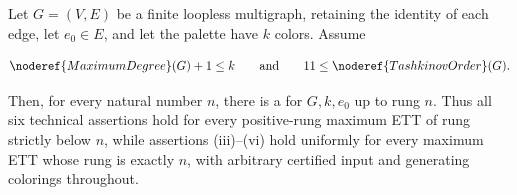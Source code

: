 \begin{theorem}
Let \(G=(V,E)\) be a finite loopless multigraph, retaining the identity of
each edge, let \(e_0\in E\), and let the palette have \(k\) colors.  Assume

\[
  \noderef{MaximumDegree}(G)+1\leq k
  \qquad\hbox{and}\qquad
  11\leq\noderef{TashkinovOrder}(G).
\]

Then, for every natural number \(n\), there is a
 for \(G,k,e_0\) up to rung \(n\).
Thus all six technical assertions hold for every positive-rung maximum ETT
of rung strictly below \(n\), while assertions (iii)--(vi) hold uniformly
for every maximum ETT whose rung is exactly \(n\), with arbitrary certified
input and generating colorings throughout.
\end{theorem}
